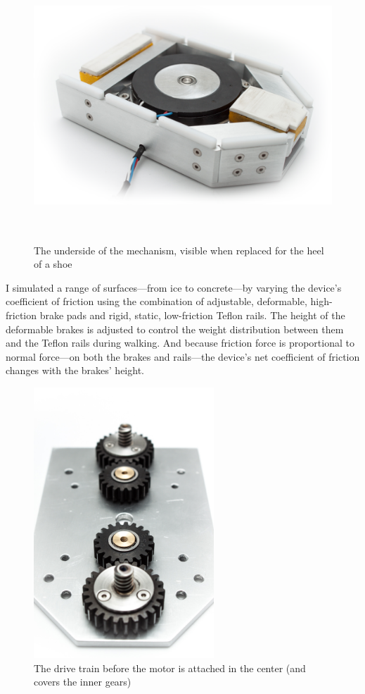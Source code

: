 \documentclass[12pt, landscape]{article}
\begin{document}
		\begin{figure}[H]
			\centering
			\includegraphics[height=4in]{media/shoe_prototype}
			\caption{The underside of the mechanism, visible when replaced for the heel of a shoe}
			\label{overview}
		\end{figure}

		I simulated a range of surfaces---from ice to concrete---by varying the device's coefficient of friction using the combination of adjustable, deformable, high-friction brake pads and rigid, static, low-friction Teflon rails.  The height of the deformable brakes is adjusted to control the weight distribution between them and the Teflon rails during walking. And because friction force is proportional to normal force---on both the brakes and rails---the device's net coefficient of friction changes with the brakes' height. 

		\begin{figure}[H]
			\centering
			\includegraphics[height=4in]{media/gears_attached}
			\caption{The drive train before the motor is attached in the center (and covers the inner gears)}
			\label{drive}
		\end{figure}
\end{document}

